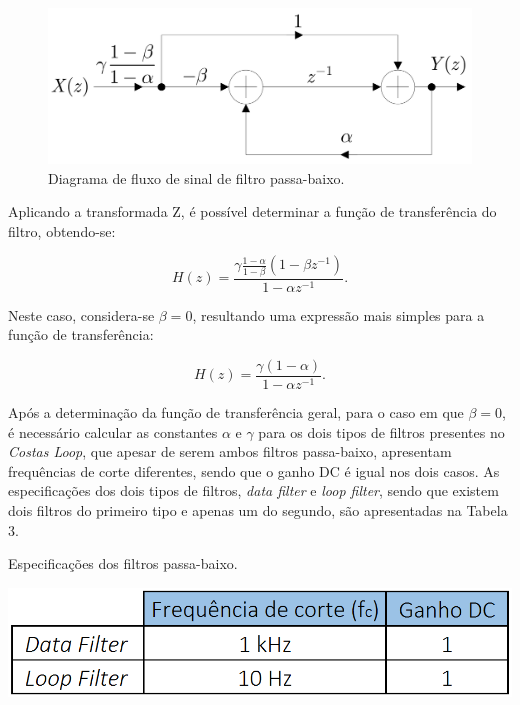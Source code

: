 \documentclass[11pt]{article}
\numberwithin{equation}{section}
\begin{document}
\begin{figure}[H]
	\centering
	\includegraphics[keepaspectratio=true, scale=0.20]{teoricas/diagrama_fluxo}
	\caption{Diagrama de fluxo de sinal de filtro passa-baixo.}
	\label{fig:fluxo}
	\vspace{-0.8em}
\end{figure}

Aplicando a transformada Z, é possível determinar a função de transferência do filtro, obtendo-se:

\vspace{-3mm}
\begin{equation}
H(z) = \frac{\gamma \frac{1-\alpha}{1-\beta} (1-\beta z^{-1})}{1-\alpha z^{-1}}.
\end{equation}
 
\vspace{1mm}
Neste caso, considera-se $\beta=0$, resultando uma expressão mais simples para a função de transferência:
 
\vspace{-3mm}
\begin{equation}
H(z) = \frac{\gamma(1-\alpha)}{1-\alpha z^{-1}}.
\end{equation} 

\vspace{1mm}
Após a determinação da função de transferência geral, para o caso em que $\beta = 0$, é necessário calcular as constantes $\alpha$ e $\gamma$ para os dois tipos de filtros presentes no \textit{Costas Loop}, que apesar de serem ambos filtros passa-baixo, apresentam frequências de corte diferentes, sendo que o ganho DC é igual nos dois casos. As especificações dos dois tipos de filtros, \textit{data filter} e \textit{loop filter}, sendo que existem dois filtros do primeiro tipo e apenas um do segundo, são apresentadas na Tabela 3. 

\begin{table}[H]
 	\centering
 	\caption{Especificações dos filtros passa-baixo.}
 	\vspace{-1.5mm}
 	\includegraphics[keepaspectratio=true, scale=0.35]{tabelas/especificacoes}
\end{table}
\end{document}
